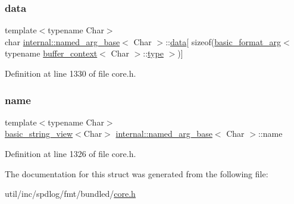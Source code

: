 \subsubsection{\texorpdfstring{data}{data}}
{\footnotesize\ttfamily template$<$typename Char$>$ \\
char \hyperlink{structinternal_1_1named__arg__base}{internal\+::named\+\_\+arg\+\_\+base}$<$ Char $>$\+::\hyperlink{namespaceinternal_adc3036f1841136e36e29e5fd339de1a1}{data}\mbox{[} sizeof(\hyperlink{classbasic__format__arg}{basic\+\_\+format\+\_\+arg}$<$ typename \hyperlink{structbuffer__context}{buffer\+\_\+context}$<$ Char $>$\+::\hyperlink{namespaceinternal_a8661864098ac0acff9a6dd7e66f59038}{type} $>$)\mbox{]}\hspace{0.3cm}{\ttfamily [mutable]}}



Definition at line 1330 of file core.\+h.

\mbox{\label{structinternal_1_1named__arg__base_a06a112fdd55d3e5ad86d0d1c343e63e0}} 
\subsubsection{\texorpdfstring{name}{name}}
{\footnotesize\ttfamily template$<$typename Char$>$ \\
\hyperlink{classbasic__string__view}{basic\+\_\+string\+\_\+view}$<$Char$>$ \hyperlink{structinternal_1_1named__arg__base}{internal\+::named\+\_\+arg\+\_\+base}$<$ Char $>$\+::name}



Definition at line 1326 of file core.\+h.



The documentation for this struct was generated from the following file\+:\begin{DoxyCompactItemize}
\item 
util/inc/spdlog/fmt/bundled/\hyperlink{core_8h}{core.\+h}\end{DoxyCompactItemize}
